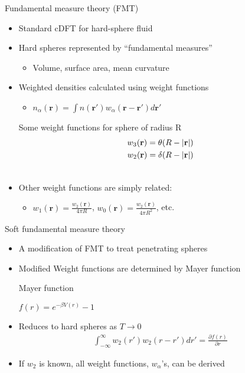 \documentclass{beamer}
\newcommand{\rr}{\textbf{r}}
\begin{document}
\begin{frame}{Fundamental measure theory (FMT)}
  \begin{itemize}
    \item Standard cDFT for hard-sphere
      fluid
    \item Hard spheres represented by ``fundamental measures''
      \begin{itemize}
        \item Volume, surface area, mean curvature
      \end{itemize}
    \item Weighted densities calculated using weight functions
      \begin{itemize}
        \item $n_{\alpha}(\rr) = \int n(\rr')w_{\alpha}(\rr -
        \rr')d\rr'$
      \end{itemize}
      \begin{block}{Some weight functions for sphere of radius R}
        \begin{align}
          w_3(\rr) = \theta (R - |\rr|) \\
          w_2(\rr) = \delta (R - |\rr|) \\
          \notag
        \end{align}
      \end{block}
    \item Other weight functions are simply related:
      \begin{itemize}
        \item $w_1(\rr) = \frac{w_2(\rr)}{4\pi R}$, $w_0(\rr) =
          \frac{w_2(\rr)}{4\pi R^2}$,  etc.
      \end{itemize}
  \end{itemize}
\end{frame}

\begin{frame}{Soft fundamental measure theory}
  \begin{itemize}
    \item A modification of FMT to treat penetrating spheres
    \item Modified Weight functions are determined by Mayer function
      \begin{block}{Mayer function}
        \begin{center}
          $f(r) = e^{-\beta V(r)} - 1$ \\
        \end{center}
      \end{block}
    \item Reduces to hard spheres as $T \to 0$
      \begin{align}
        \int_{-\infty}^{\infty}w_2(r')w_2(r - r') dr' = \frac{\partial f(r)}{\partial r}
      \end{align}
    \item If $w_2$ is known, all weight functions, $w_{\alpha}$'s, can
      be derived
  \end{itemize}
\end{frame}
\end{document}
